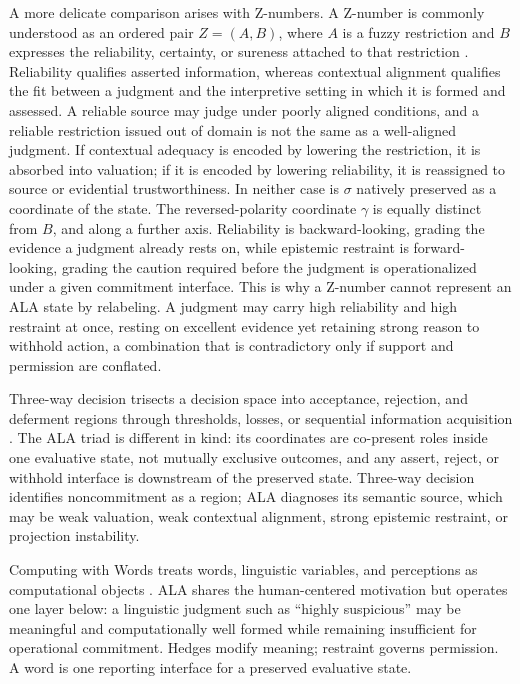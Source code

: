 \documentclass[reqno,final]{amsart}
\theoremstyle{definition}
\theoremstyle{plain}
\theoremstyle{remark}
\begin{document}
A more delicate comparison arises with Z-numbers. A Z-number is commonly understood as an ordered pair \(Z=(A,B)\), where \(A\) is a fuzzy restriction and \(B\) expresses the reliability, certainty, or sureness attached to that restriction \cite{Zadeh2011,Yager2012}. Reliability qualifies asserted information, whereas contextual alignment qualifies the fit between a judgment and the interpretive setting in which it is formed and assessed. A reliable source may judge under poorly aligned conditions, and a reliable restriction issued out of domain is not the same as a well-aligned judgment. If contextual adequacy is encoded by lowering the restriction, it is absorbed into valuation; if it is encoded by lowering reliability, it is reassigned to source or evidential trustworthiness. In neither case is \(\sigma\) natively preserved as a coordinate of the state. The reversed-polarity coordinate \(\gamma\) is equally distinct from \(B\), and along a further axis. Reliability is backward-looking, grading the evidence a judgment already rests on, while epistemic restraint is forward-looking, grading the caution required before the judgment is operationalized under a given commitment interface. This is why a Z-number cannot represent an ALA state by relabeling. A judgment may carry high reliability and high restraint at once, resting on excellent evidence yet retaining strong reason to withhold action, a combination that is contradictory only if support and permission are conflated.

Three-way decision trisects a decision space into acceptance, rejection, and deferment regions through thresholds, losses, or sequential information acquisition \cite{Yao2010,YaoTWD2012,YaoIJAR2024}. The ALA triad is different in kind: its coordinates are co-present roles inside one evaluative state, not mutually exclusive outcomes, and any assert, reject, or withhold interface is downstream of the preserved state. Three-way decision identifies noncommitment as a region; ALA diagnoses its semantic source, which may be weak valuation, weak contextual alignment, strong epistemic restraint, or projection instability.

Computing with Words treats words, linguistic variables, and perceptions as computational objects \cite{Zadeh1975,Zadeh1996}. ALA shares the human-centered motivation but operates one layer below: a linguistic judgment such as ``highly suspicious'' may be meaningful and computationally well formed while remaining insufficient for operational commitment. Hedges modify meaning; restraint governs permission. A word is one reporting interface for a preserved evaluative state.
\end{document}
